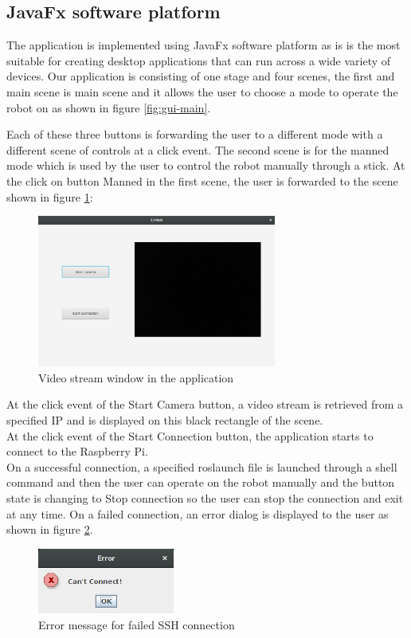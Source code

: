 \documentclass[12pt]{article}
\begin{document}
\subsection{JavaFx software platform}
The application is implemented using JavaFx software platform as is is the most suitable for creating
desktop applications that can run across a wide variety of devices.
Our application is consisting of one stage and four scenes, the first and main scene is main scene and it
allows the user to choose a mode to operate the robot on as shown in figure \ref{fig:gui-main}.

Each of these three buttons is forwarding the user to a different mode with a different scene of controls at a click event.
The second scene is for the manned mode which is used by the user to control the robot manually through a stick.
At the click on button Manned in the first scene, the user is forwarded to the scene shown in figure \ref{fig:camera-scene}:

\begin{figure}[H]
	\centering
	\includegraphics[width =0.7\textwidth]{Fig/camera-scene.png}
	\caption{Video stream window in the application}
	\label{fig:camera-scene}
\end{figure}

\noindent At the click event of the Start Camera button, a video stream is retrieved from a specified IP and is displayed on this black rectangle of the scene.\\

\noindent At the click event of the Start Connection button, the application starts to connect to the Raspberry Pi.\\
On a successful connection, a specified roslaunch file is launched through a shell command and then the user can operate on the robot manually and the button state is changing to Stop connection so the user can stop the connection and exit at any time. On a failed connection, an error dialog is displayed to the user as shown in figure \ref{fig:error-window}.
\begin{figure}[H]
	\centering
	\includegraphics[width =0.4\textwidth]{Fig/error-window.png}
	\caption{Error message for failed SSH connection}
	\label{fig:error-window}
\end{figure}
\end{document}
